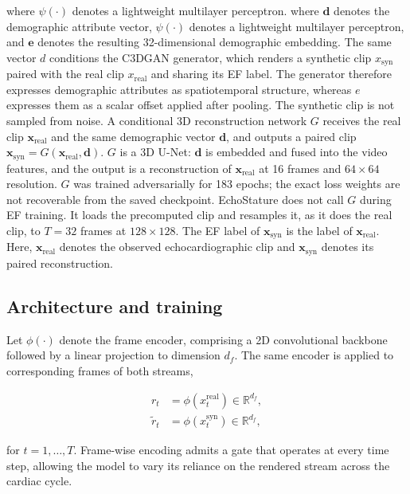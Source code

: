 \documentclass{ws-procs11x85}
\begin{document}
{\color{blue}where $\psi(\cdot)$ denotes a lightweight multilayer perceptron.}
{\color{red}where $\mathbf{d}$ denotes the demographic attribute vector,
$\psi(\cdot)$ denotes a lightweight multilayer perceptron, and
$\mathbf{e}$ denotes the resulting 32-dimensional demographic embedding.} {\color{blue}The same vector $d$ conditions the C3DGAN generator, which renders a synthetic clip $x_{\mathrm{syn}}$ paired with the real clip $x_{\mathrm{real}}$ and sharing its EF label. The generator therefore expresses demographic attributes as spatiotemporal structure, whereas $e$ expresses them as a scalar offset applied after pooling.}
{\color{red}The synthetic clip is not sampled from noise. A conditional 3D reconstruction network $G$ receives the real clip $\mathbf{x}_{\mathrm{real}}$ and the same demographic vector $\mathbf{d}$, and outputs a paired clip $\mathbf{x}_{\mathrm{syn}}=G(\mathbf{x}_{\mathrm{real}}, \mathbf{d})$. $G$ is a 3D U-Net: $\mathbf{d}$ is embedded and fused into the video features, and the output is a reconstruction of $\mathbf{x}_{\mathrm{real}}$ at 16 frames and $64\times 64$ resolution. $G$ was trained adversarially for 183 epochs; the exact loss weights are not recoverable from the saved checkpoint. EchoStature does not call $G$ during EF training. It loads the precomputed clip and resamples it, as it does the real clip, to $T=32$ frames at $128\times 128$. The EF label of $\mathbf{x}_{\mathrm{syn}}$ is the label of $\mathbf{x}_{\mathrm{real}}$. Here, $\mathbf{x}_{\mathrm{real}}$ denotes the observed echocardiographic clip and $\mathbf{x}_{\mathrm{syn}}$ denotes its paired reconstruction.}

\subsection{Architecture and training}

Let $\phi(\cdot)$ denote the frame encoder, comprising a 2D convolutional backbone followed by a linear projection to dimension $d_f$.
The same encoder is applied to corresponding frames of both streams,

\begin{align}
r_t &= \phi\!\left(x_t^{\mathrm{real}}\right)\in\mathbb{R}^{d_f}, \\
\tilde{r}_t &= \phi\!\left(x_t^{\mathrm{syn}}\right)\in\mathbb{R}^{d_f},
\end{align}

for $t=1,\ldots,T$.
Frame-wise encoding admits a gate that operates at every time step, allowing the model to vary its reliance on the rendered stream across the cardiac cycle.
\end{document}
